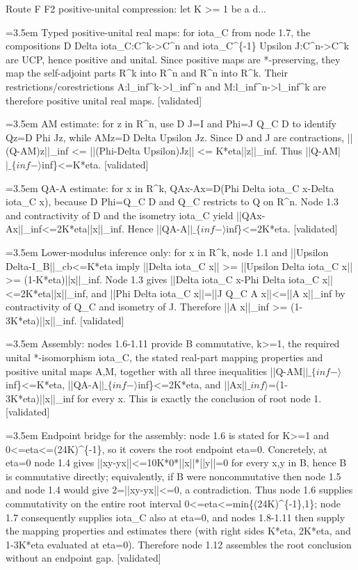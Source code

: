 \documentclass{article}
\newcommand{\step}[1]{\par\noindent\hangindent=3.5em\hangafter=1%
  \makebox[3.5em][l]{\textbf{#1.}}}
\newcommand{\steptag}[1]{\hfill{\small\textsf{[#1]}}}
\begin{document}
\begin{proofbox}{Route F F2 positive-unital compression: let K >= 1 be a d...}
\step{1.8} Typed positive-unital real maps: for iota\_C from node 1.7, the compositions D Delta iota\_C:C\textasciicircum{}k->C\textasciicircum{}n and iota\_C\textasciicircum{}\{-1\} Upsilon J:C\textasciicircum{}n->C\textasciicircum{}k are UCP, hence positive and unital. Since positive maps are *-preserving, they map the self-adjoint parts R\textasciicircum{}k into R\textasciicircum{}n and R\textasciicircum{}n into R\textasciicircum{}k. Their restrictions/corestrictions A:l\_inf\textasciicircum{}k->l\_inf\textasciicircum{}n and M:l\_inf\textasciicircum{}n->l\_inf\textasciicircum{}k are therefore positive unital real maps. \steptag{validated} \\[4pt]
\step{1.9} AM estimate: for z in R\textasciicircum{}n, use D J=I and Phi=J Q\_C D to identify Qz=D Phi Jz, while AMz=D Delta Upsilon Jz. Since D and J are contractions, ||(Q-AM)z||\_inf <= ||(Phi-Delta Upsilon)Jz|| <= K*eta||z||\_inf. Thus ||Q-AM|$|\_\{inf-\rangle$inf\}<=K*eta. \steptag{validated} \\[4pt]
\step{1.10} QA-A estimate: for x in R\textasciicircum{}k, QAx-Ax=D(Phi Delta iota\_C x-Delta iota\_C x), because D Phi=Q\_C D and Q\_C restricts to Q on R\textasciicircum{}n. Node 1.3 and contractivity of D and the isometry iota\_C yield ||QAx-Ax||\_inf<=2K*eta||x||\_inf. Hence ||QA-A|$|\_\{inf-\rangle$inf\}<=2K*eta. \steptag{validated} \\[4pt]
\step{1.11} Lower-modulus inference only: for x in R\textasciicircum{}k, node 1.1 and ||Upsilon Delta-I\_B||\_cb<=K*eta imply ||Delta iota\_C x|| >= ||Upsilon Delta iota\_C x|| >= (1-K*eta)||x||\_inf. Node 1.3 gives ||Delta iota\_C x-Phi Delta iota\_C x||<=2K*eta||x||\_inf, and ||Phi Delta iota\_C x||=||J Q\_C A x||<=||A x||\_inf by contractivity of Q\_C and isometry of J. Therefore ||A x||\_inf >= (1-3K*eta)||x||\_inf. \steptag{validated} \\[4pt]
\step{1.12} Assembly: nodes 1.6-1.11 provide B commutative, k>=1, the required unital *-isomorphism iota\_C, the stated real-part mapping properties and positive unital maps A,M, together with all three inequalities ||Q-AM|$|\_\{inf-\rangle$inf\}<=K*eta, ||QA-A|$|\_\{inf-\rangle$inf\}<=2K*eta, and ||Ax|$|\_inf\rangle$=(1-3K*eta)||x||\_inf for every x. This is exactly the conclusion of root node 1. \steptag{validated} \\[6pt]
\step{1.12.1} Endpoint bridge for the assembly: node 1.6 is stated for K>=1 and 0<=eta<=(24K)\textasciicircum{}\{-1\}, so it covers the root endpoint eta=0. Concretely, at eta=0 node 1.4 gives ||xy-yx||<=10K*0*||x||*||y||=0 for every x,y in B, hence B is commutative directly; equivalently, if B were noncommutative then node 1.5 and node 1.4 would give 2=||xy-yx||<=0, a contradiction. Thus node 1.6 supplies commutativity on the entire root interval 0<=eta<=min\{(24K)\textasciicircum{}\{-1\},1\}; node 1.7 consequently supplies iota\_C also at eta=0, and nodes 1.8-1.11 then supply the mapping properties and estimates there (with right sides K*eta, 2K*eta, and 1-3K*eta evaluated at eta=0). Therefore node 1.12 assembles the root conclusion without an endpoint gap. \steptag{validated} \\[4pt]
\end{proofbox}
\end{document}

